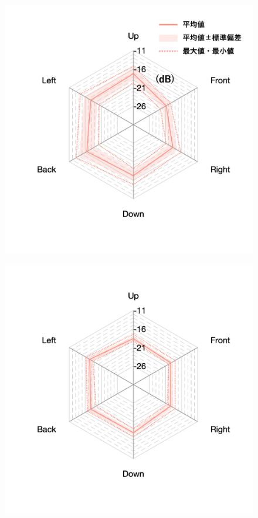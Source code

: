 \documentclass[11pt,a4j]{jreport}
\begin{document}
\newpage
\begin{figure}[H]
  \begin{minipage}[b]{.33\textwidth}
      \centering
      \includegraphics[width=1\linewidth]{images/realHallDirSt/early_hall_a_withLegend.png}
      \label{fig:ホールAにおけるSTEarly}
  \end{minipage}%
  \begin{minipage}[b]{.33\textwidth}
    \centering
    \includegraphics[width=1\linewidth]{images/realHallDirSt/early_hall_b_allpoints.png}

\end{minipage}
\end{figure}
\end{document}
